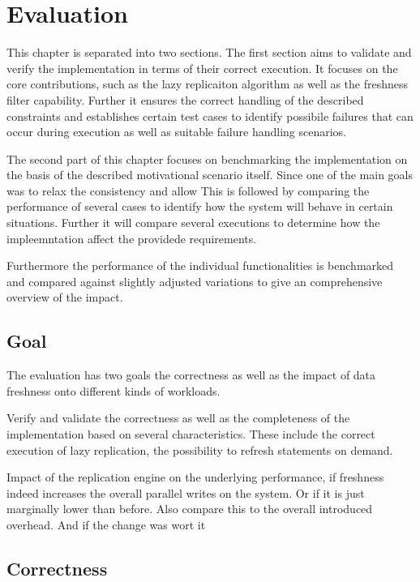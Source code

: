 \chapter{Evaluation}
\label{c:evaluation}

This chapter is separated into two sections. The first section aims to validate and verify the implementation in terms of their
correct execution. It focuses on the core contributions, such as the lazy replicaiton algorithm as well as the freshness filter capability.
Further it ensures the correct handling of the described constraints and establishes certain test cases to identify possibile failures that can occur 
during execution as well as suitable failure handling scenarios.

The second part of this chapter focuses on benchmarking the implementation on the basis of the described motivational scenario itself.
Since one of the main goals was to relax the consistency and allow 
This is followed by comparing the performance of several cases to identify how the system will behave in certain situations.
Further it will compare several executions to determine how the impleemntation affect the providede requirements.

Furthermore the performance of the individual functionalities is benchmarked and compared against slightly adjusted variations 
to give an comprehensive overview of the impact.


\section{Goal}
The evaluation has two goals the correctness as well as the impact of data freshness onto different kinds of workloads.

Verify and validate the correctness as well as the completeness of the implementation based on several characteristics.
These include the correct execution of lazy replication, the possibility to refresh statements on demand.

Impact of the replication engine on the underlying performance, if freshness indeed increases the overall parallel writes on the system.
Or if it is just marginally lower than before. Also compare this to the overall introduced overhead. And if the change was wort it



\section{Correctness}

